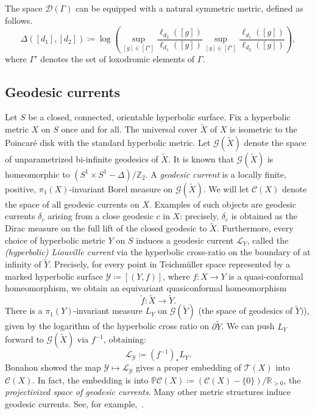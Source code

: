 \documentclass[12pt]{amsart}
\numberwithin{equation}{section}
\numberwithin{figure}{section}
\theoremstyle{definition}
\theoremstyle{plain}
\newcommand*{\wt}[1]{\widetilde{#1}}
\begin{document}
The space $\mathcal{D}(\Gamma)$ can be equipped with a natural symmetric metric, defined as follows.
\begin{equation}
\Delta([d_1],[d_2]) \coloneqq \log \left(\sup_{[g] \in [\Gamma']} \frac{\ell_{d_2}([g])}{\ell_{d_1}([g])} \sup_{[g] \in [\Gamma']} \frac{\ell_{d_1}([g])}{\ell_{d_2}([g])} \right),
\label{eq:delta_metric}
\end{equation}
where $\Gamma'$ denotes the set of loxodromic elements of $\Gamma$.

\subsection{Geodesic currents}\label{ssec:currents}

Let $S$ be a closed, connected, orientable hyperbolic surface. Fix a hyperbolic metric $X$ on $S$ once and for all. The universal cover $\wt{X}$ of $X$ is isometric to the Poincar\'e disk with the standard hyperbolic metric. Let $\mathcal{G}(\wt{X})$ denote the space of unparametrized bi-infinite geodesics of $\wt{X}$. It is known that $\mathcal{G}(\wt{X})$ is homeomorphic to $(S^1 \times S^1 - \Delta)/\mathbb{Z}_2$. A \emph{geodesic current} is a locally finite, positive, $\pi_1(X)$-invariant Borel  measure on $\mathcal{G}(\wt{X})$. We will let $\mathcal{C}(X)$ denote the space of all geodesic currents on $X$. Examples of such objects are geodesic currents $\delta_c$ arising from a close geodesic $c$ in $X$: precisely, $\delta_c$ is obtained as the Dirac measure on the full lift of the closed geodesic to $\wt{X}$. Furthermore, every choice of hyperbolic metric $Y$ on $S$ induces a geodesic current $\mathcal{L}_Y$, called the \emph{(hyperbolic) Liouville current} via the hyperbolic cross-ratio on the boundary of at infinity of $\wt{Y}$.
Precisely, for every point in Teichm\"uller space represented by a marked hyperbolic surface $\mathcal{Y}\coloneqq[(Y,f)]$, where $f \colon X \to Y$ is a quasi-conformal homeomorphism, we obtain an equivariant quasiconformal homeomorphism
\[
\wt{f} \colon \wt{X} \to \wt{Y}.
\]
There is a $\pi_1(Y)$-invariant measure $L_Y$ on $\mathcal{G}(\wt{Y})$ (the space of geodesics of $\wt{Y})$), given by the logarithm of the hyperbolic cross ratio on $\partial \wt{Y}$.
We can push $L_Y$ forward to $\mathcal{G}(\wt{X})$ via $f^{-1}$, obtaining:
\[
\mathcal{L}_{\mathcal{Y}} \coloneqq (f^{-1})_* L_Y.
\]
Bonahon showed the map $\mathcal{Y} \mapsto \mathcal{L}_\mathcal{Y}$ gives a proper embedding of $\mathcal{T}(X)$ into $\mathcal{C}(X)$. In fact, the embedding is into $\mathbb{P}\mathcal{C}(X) \coloneqq (\mathcal{C}(X)-\{ 0\}) / \mathbb{R}_{>0}$, the \emph{projectivized space of geodesic currents}. 
Many other metric structures induce geodesic currents. See, for example,~\cite{Otal90:SpectreMarqueNegative,CFF92:RigidityNonPosCurvedRiem,HP97:RigidityNegCurvedCone,BL17:FlatRigidity,Erlandsson:WordLength}.
\end{document}
